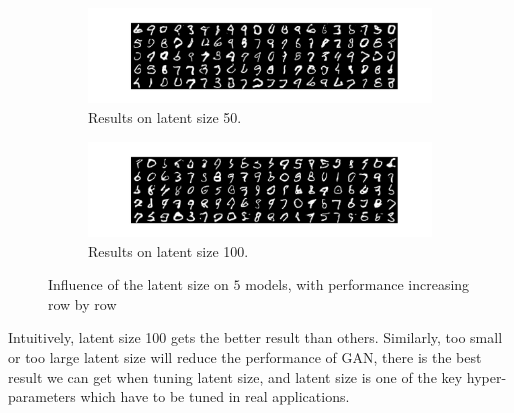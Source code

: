 \documentclass[12pt,letterpaper]{article}
\begin{document}
\begin{figure}[h]
    \medskip
    \begin{subfigure}{0.49\textwidth}
    \includegraphics[width=\linewidth]{GAN_MNIST_0_50_256.png}
    \caption{\small Results on latent size 50.} \label{fig:c}
    \end{subfigure}\hspace*{\fill}
    \begin{subfigure}{0.49\textwidth}
    \includegraphics[width=\linewidth]{GAN_MNIST_0_100_256.png}
    \caption{\small Results on latent size 100.} \label{fig:d}
    \end{subfigure}
    
    \hspace*{\fill}
    \caption{Influence of the latent size on $5$ models, with performance increasing row by row} \label{fig:MNIST_GAN_latent}
\end{figure}

Intuitively, latent size 100 gets the better result than others. Similarly, too small or too large latent size will reduce the performance of GAN, there is the best result we can get when tuning latent size, and latent size is one of the key hyper-parameters which have to be tuned in real applications.
\end{document}
